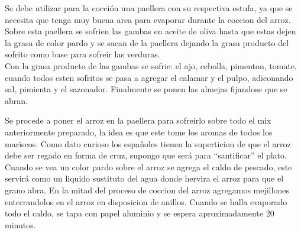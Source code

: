 Se debe utilizar para la cocción una paellera con su respectiva estufa, ya que se necesita que tenga muy buena area para evaporar durante la coccion del arroz. Sobre esta paellera se sofrien las gambas en aceite de oliva hasta que estas dejen la grasa de color pardo y se sacan de la paellera dejando la grasa producto del sofrito como base para sofreir las verduras.\\

Con la grasa producto de las gambas se sofrie: el ajo, cebolla, pimenton, tomate, cuando todos esten sofritos se pasa a agregar el calamar y el pulpo, adiconando sal, pimienta y el sazonador. Finalmente se ponen las almejas fijandose que se abran.

Se procede a poner el arroz en la paellera para sofreirlo sobre todo el mix anteriormente preparado, la idea es que este tome los aromas de todos los mariscos. Como dato curioso los españoles tienen la superticion de que el arroz debe ser regado en forma de cruz, supongo que será para ``santificar'' el plato.\\

Cuando se vea un color pardo sobre el arroz se agrega el caldo de pescado, este servirá como un liquido sustituto del agua donde hervira el arroz para que el grano abra. En la mitad del proceso de coccion del arroz agregamos mejillones enterrandolos en el arroz en disposicion de anillos. Cuando se halla evaporado todo el caldo, se tapa con papel aluminio y se espera aproximadamente 20 minutos.